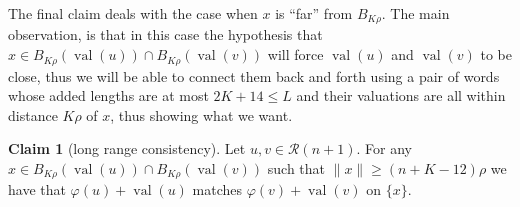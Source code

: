 \documentclass{article}
\theoremstyle{definition}
\newtheorem{claim}[theorem]{Claim} %
\theoremstyle{definition}
\newcommand{\norm}[1]{\|{#1}\|}
\newcommand{\val}{\operatorname{val}}
\begin{document}
    The final claim deals with the case when $x$ is ``far'' from $B_{K\rho}$. The main observation, is that in this case the hypothesis that $x\in B_{K\rho}(\val(u))\cap B_{K\rho}(\val(v))$ will force $\val(u)$ and $\val(v)$ to be close, thus we will be able to connect them back and forth using a pair of words whose added lengths are at most $2K+14\leq L$ and their valuations are all within distance $K\rho$ of $x$, thus showing what we want.

     \begin{claim}[long range consistency]\label{claim:long-range}
        Let $u,v\in \mathcal{R}(n+1)$. For any $x\in B_{K\rho}(\val(u))\cap B_{K\rho}(\val(v))$ such that $\norm{x}\geq (n+K-12)\rho$ we have that $\varphi(u)+\val(u)$ matches $\varphi(v)+\val(v)$ on $\{x\}$.
    \end{claim}
\end{document}

